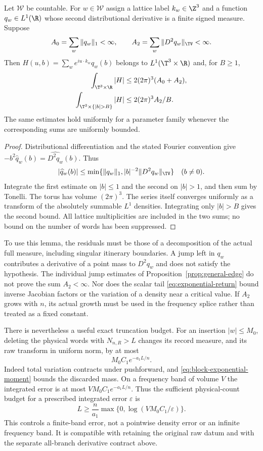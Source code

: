 \begin{lemma}
\label{lem:raw-residual-sum}
Let $\mathcal W$ be countable. For $w\in\mathcal W$ assign a lattice
label $k_w\in\Z^3$ and a function $q_w\in L^1(\R)$ whose second
distributional derivative is a finite signed measure. Suppose
\[
 A_0=\sum_w\|q_w\|_1<\infty,\qquad
 A_2=\sum_w\|D^2q_w\|_{\TV}<\infty.
\]
Then
$H(u,b)=\sum_w e^{iu\cdot k_w}\widehat q_w(b)$ belongs to
$L^1(\T^3\times\R)$ and, for $B\ge1$,
\begin{align}\label{eq:absolute-residual-sum}
 \int_{\T^3\times\R}|H|&\le2(2\pi)^3(A_0+A_2),\\
 \int_{\T^3\times\{|b|>B\}}|H|&\le2(2\pi)^3A_2/B.\nonumber
\end{align}
The same estimates hold uniformly for a parameter family whenever the
corresponding sums are uniformly bounded.
\end{lemma}
\begin{proof}
Distributional differentiation and the stated Fourier convention give
$-b^2\widehat q_w(b)=\widehat{D^2q_w}(b)$. Thus
\[
 |\widehat q_w(b)|\le\min\{\|q_w\|_1,
                    |b|^{-2}\|D^2q_w\|_{\TV}\}\quad(b\ne0).
\]
Integrate the first estimate on $|b|\le1$ and the second on $|b|>1$,
and then sum by Tonelli. The torus has volume $(2\pi)^3$.
The series itself converges uniformly as a transform of the absolutely
summable $L^1$ densities. Integrating only $|b|>B$ gives the second
bound. All lattice multiplicities are included in the two sums; no
bound on the number of words has been suppressed.
\end{proof}

To use this lemma, the residuals must be those of a decomposition of the
actual full measure, including singular itinerary boundaries. A jump left
in $q_w$ contributes a derivative of a point mass to $D^2q_w$ and does
not satisfy the hypothesis. The individual jump estimates of
Proposition~\ref{prop:general-edge} do not prove the sum $A_2<\infty$.
Nor does the scalar tail \eqref{eq:exponential-return} bound inverse
Jacobian factors or the variation of a density near a critical value.
If $A_2$ grows with $n$, its actual growth must be used in the frequency
splice rather than treated as a fixed constant.

There is nevertheless a useful exact truncation budget. For an insertion
$|w|\le M_0$, deleting the physical words with $N_{n,R}>L$ changes its
record measure, and its raw transform in uniform norm, by at most
\begin{equation}\label{eq:physical-count-truncation}
 M_0C_1e^{-a_1L/n}.
\end{equation}
Indeed total variation contracts under pushforward, and
\eqref{eq:block-exponential-moment} bounds the discarded mass.
On a frequency band of volume $V$ the integrated error is at most
$VM_0C_1e^{-a_1L/n}$. Thus the sufficient physical-count budget for a
prescribed integrated error $\varepsilon$ is
\[
 L\ge\frac{n}{a_1}\max\{0,\log(VM_0C_1/\varepsilon)\}.
\]
This controls a finite-band error, not a pointwise density error or an
infinite frequency band. It is compatible with retaining the original
raw datum and with the separate all-branch derivative contract above.
